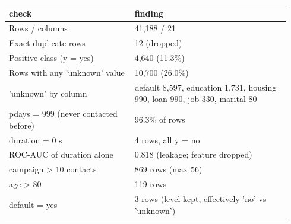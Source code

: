 \begin{tabular}{p{0.42\linewidth}p{0.52\linewidth}}
\toprule
check & finding \\
\midrule
Rows / columns & 41,188 / 21 \\
Exact duplicate rows & 12 (dropped) \\
Positive class (y = yes) & 4,640 (11.3\%) \\
Rows with any 'unknown' value & 10,700 (26.0\%) \\
'unknown' by column & default 8,597, education 1,731, housing 990, loan 990, job 330, marital 80 \\
pdays = 999 (never contacted before) & 96.3\% of rows \\
duration = 0 s & 4 rows, all y = no \\
ROC-AUC of duration alone & 0.818 (leakage; feature dropped) \\
campaign > 10 contacts & 869 rows (max 56) \\
age > 80 & 119 rows \\
default = yes & 3 rows (level kept, effectively 'no' vs 'unknown') \\
\bottomrule
\end{tabular}